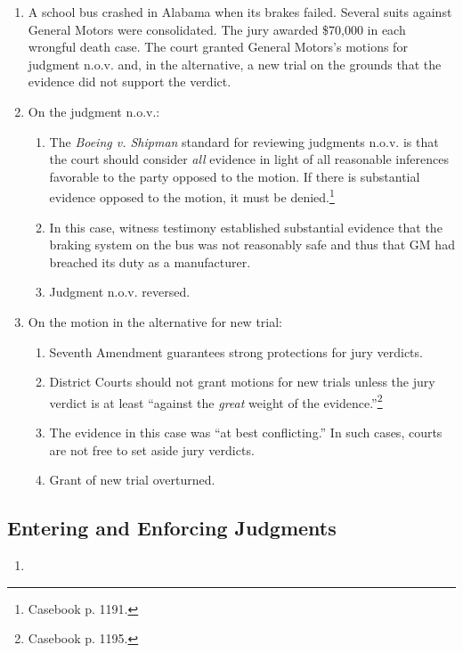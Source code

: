 \begin{enumerate}
    \item A school bus crashed in Alabama when its brakes failed. Several suits against General Motors were consolidated. The jury awarded \$70,000 in each wrongful death case. The court granted General Motors's motions for judgment n.o.v. and, in the alternative, a new trial on the grounds that the evidence did not support the verdict. 
    \item On the judgment n.o.v.:
    \begin{enumerate}
        \item The \emph{Boeing v. Shipman} standard for reviewing judgments n.o.v. is that the court should consider \emph{all} evidence in light of all reasonable inferences favorable to the party opposed to the motion. If there is substantial evidence opposed to the motion, it must be denied.\footnote{Casebook p. 1191.}
        \item In this case, witness testimony established substantial evidence that the braking system on the bus was not reasonably safe and thus that GM had breached its duty as a manufacturer.
        \item Judgment n.o.v. reversed.
    \end{enumerate}
    \item On the motion in the alternative for new trial:
    \begin{enumerate}
        \item Seventh Amendment guarantees strong protections for jury verdicts.
        \item District Courts should not grant motions for new trials unless the jury verdict is at least ``against the \emph{great} weight of the evidence.''\footnote{Casebook p. 1195.}
        \item The evidence in this case was ``at best conflicting.'' In such cases, courts are not free to set aside jury verdicts.
        \item Grant of new trial overturned.
    \end{enumerate}
\end{enumerate}

\subsection{Entering and Enforcing Judgments}

\begin{enumerate}
    \item 
\end{enumerate}


